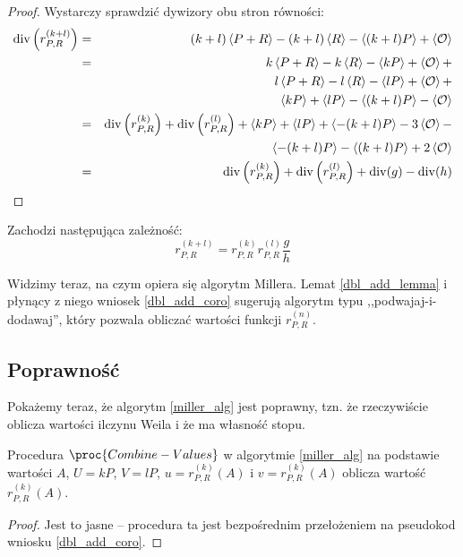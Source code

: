 \begin{proof}
Wystarczy sprawdzić dywizory obu stron równości:
\begin{eqnarray*}
\operatorname{div}\left(r_{P,R}^{(k+l)}\right)
& = & (k+l)\left\langle P+R\right\rangle - (k+l)\left\langle R\right\rangle - \left\langle(k+l)P\right\rangle + \left\langle\mathcal{O}\right\rangle \\
& = & k\left\langle P+R\right\rangle - k\left\langle R\right\rangle - \left\langle kP\right\rangle + \left\langle\mathcal{O}\right\rangle + \\
&   & l\left\langle P+R\right\rangle - l\left\langle R\right\rangle - \left\langle lP\right\rangle + \left\langle\mathcal{O}\right\rangle + \\
&   & \left\langle kP\right\rangle + \left\langle lP\right\rangle - \left\langle(k+l)P\right\rangle - \left\langle\mathcal{O}\right\rangle \\
& = & \operatorname{div}\left(r_{P,R}^{(k)}\right) + \operatorname{div}\left(r_{P,R}^{(l)}\right) +
      \left\langle kP\right\rangle + \left\langle lP\right\rangle + \left\langle-(k+l)P\right\rangle - 3\left\langle\mathcal{O}\right\rangle - \\
&   & \left\langle-(k+l)P\right\rangle - \left\langle(k+l)P\right\rangle + 2\left\langle\mathcal{O}\right\rangle \\
& = & \operatorname{div}\left(r_{P,R}^{(k)}\right) + \operatorname{div}\left(r_{P,R}^{(l)}\right) +
      \operatorname{div}(g) - \operatorname{div}(h)
\end{eqnarray*}
\end{proof}

\begin{corollary}\label{dbl_add_coro}
Zachodzi następująca zależność:
\begin{equation}
r_{P,R}^{(k+l)} = r_{P,R}^{(k)} r_{P,R}^{(l)} \frac{g}{h}
\end{equation}
\end{corollary}

Widzimy teraz, na czym opiera się algorytm Millera.
Lemat \ref{dbl_add_lemma} i płynący z niego wniosek \ref{dbl_add_coro}
sugerują algorytm typu ,,podwajaj-i-dodawaj'',
który pozwala obliczać wartości funkcji $r_{P,R}^{(n)}$.

\subsection*{Poprawność}

Pokażemy teraz, że algorytm \ref{miller_alg} jest poprawny,
tzn. że rzeczywiście oblicza wartości ilczynu Weila
i że ma własność stopu.

\begin{lemma}
Procedura $\proc{Combine-Values}$ w algorytmie \ref{miller_alg}
na podstawie wartości
$A$, $U = kP$, $V = lP$, $u = r_{P,R}^{(k)}(A)$ i $v = r_{P,R}^{(k)}(A)$
oblicza
wartość $r_{P,R}^{(k)}(A)$.
\end{lemma}

\begin{proof}
Jest to jasne -- procedura ta jest bezpośrednim przełożeniem na pseudokod
wniosku \ref{dbl_add_coro}.
\end{proof}


